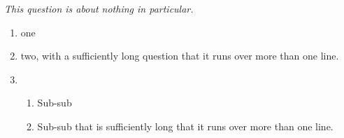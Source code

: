 \documentclass{ouexam}
\begin{document}
\question
\emph{This question is about nothing in particular.}
\begin{enumerate}
\item one
\item two, with a sufficiently long question that it runs over more than one line.
\item 
\begin{enumerate}
\item Sub-sub
\item Sub-sub that is sufficiently long that it runs over more than one line.
\end{enumerate}
\end{enumerate}
\end{document}
